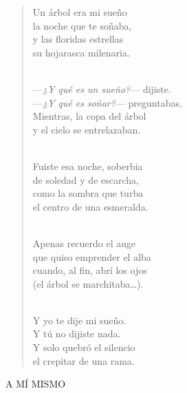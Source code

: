 \documentclass[a4paper, 12pt]{article}
\begin{document}
\begin{verse}
Un árbol era mi sueño\\
la noche que te soñaba,\\
y las floridas estrellas\\
su hojarasca milenaria.\\
~ 

—\textit{¿Y qué es un sueño?}— dijiste.\\
—\textit{¿Y qué es soñar?}— preguntabas.\\
Mientras, la copa del árbol\\
y el cielo se entrelazaban.\\
~ 

Fuiste esa noche, soberbia\\
de soledad y de escarcha,\\
como la sombra que turba\\
el centro de una esmeralda.\\
~ 

Apenas recuerdo el auge\\
que quiso emprender el alba\\
cuando, al fin, abrí los ojos\\
(el árbol se marchitaba…).\\
~ 

Y yo te dije mi sueño.\\
Y tú no dijiste nada.\\
Y solo quebró el silencio\\
el crepitar de una rama.\\
\end{verse}

\pagebreak 

\centerline{A MÍ MISMO}
~
\end{document}
